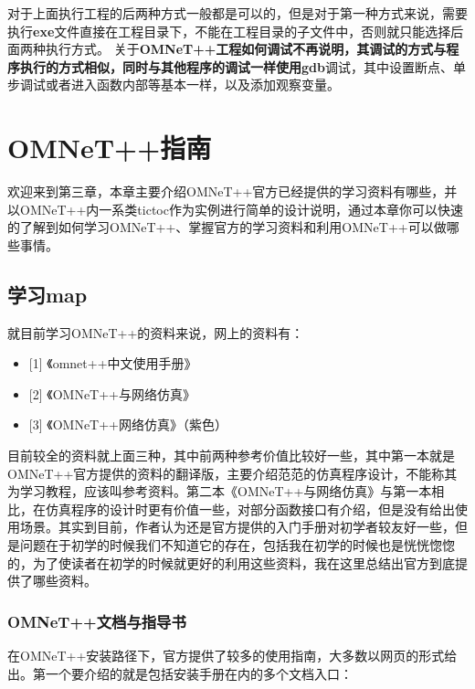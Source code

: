 对于上面执行工程的后两种方式一般都是可以的，但是对于第一种方式来说，需要执行\textbf{exe}文件直接在工程目录下，不能在工程目录的子文件中，否则就只能选择后面两种执行方式。
关于\textbf{OMNeT++\textbf{工程如何调试不再说明，其调试的方式与程序执行的方式相似，同时与其他程序的调试一样使用}gdb}调试，其中设置断点、单步调试或者进入函数内部等基本一样，以及添加观察变量。

\chapter{OMNeT++指南}
\label{omnet指南}

欢迎来到第三章，本章主要介绍OMNeT++官方已经提供的学习资料有哪些，并以OMNeT++内一系类tictoc作为实例进行简单的设计说明，通过本章你可以快速的了解到如何学习OMNeT++、掌握官方的学习资料和利用OMNeT++可以做哪些事情。

\section{学习map}
\label{学习map}

就目前学习OMNeT++的资料来说，网上的资料有：

\begin{itemize}
\item {[1]} 《omnet++中文使用手册》

\item {[2]} 《OMNeT++与网络仿真》

\item {[3]} 《OMNeT++网络仿真》（紫色） 

\end{itemize}

目前较全的资料就上面三种，其中前两种参考价值比较好一些，其中第一本就是OMNeT++官方提供的资料的翻译版，主要介绍范范的仿真程序设计，不能称其为学习教程，应该叫参考资料。第二本《OMNeT++与网络仿真》与第一本相比，在仿真程序的设计时更有价值一些，对部分函数接口有介绍，但是没有给出使用场景。其实到目前，作者认为还是官方提供的入门手册对初学者较友好一些，但是问题在于初学的时候我们不知道它的存在，包括我在初学的时候也是恍恍惚惚的，为了使读者在初学的时候就更好的利用这些资料，我在这里总结出官方到底提供了哪些资料。

\subsection{OMNeT++文档与指导书}
\label{omnet文档与指导书}

在OMNeT++安装路径下，官方提供了较多的使用指南，大多数以网页的形式给出。第一个要介绍的就是包括安装手册在内的多个文档入口：

